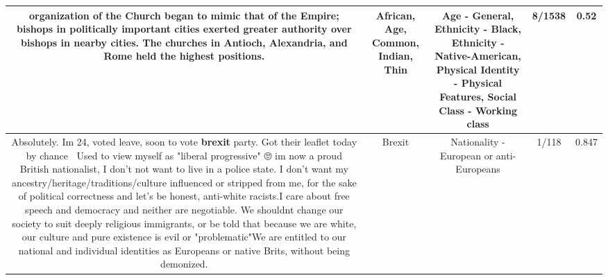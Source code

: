 \documentclass[11pt]{article}
\newlength\mylength
\begin{document}
\begin{center}
\begin{longtable}{|C{.65\mylength}|C{.30\mylength}|C{.12\mylength}|C{.12\mylength}|C{.12\mylength}|}
organization of the Church began to mimic that of the Empire; bishops in politically important cities exerted greater authority over bishops in nearby cities. The churches in Antioch, Alexandria, and Rome held the highest positions.\normalsize   & African, Age, Common, Indian, Thin & Age - General, Ethnicity - Black, Ethnicity - Native-American, Physical Identity - Physical Features, Social Class - Working class & 8/1538 & 0.52 \\  \hline
  \small Absolutely. Im 24, voted leave, soon to vote \textbf{brexit} party. Got their leaflet today by chance 👍🏻Used to view myself as "liberal progressive" 🙄 im now a proud British nationalist, I don't not want to live in a police state. I don't want my ancestry/heritage/traditions/culture influenced or stripped from me, for the sake of political correctness and let's be honest, anti-white racists.I care about free speech and democracy and neither are negotiable. We shouldnt change our society to suit deeply religious immigrants, or be told that because we are white, our culture and pure existence is evil or "problematic"We are entitled to our national and individual identities as Europeans or native Brits, without being demonized.\normalsize   & Brexit & Nationality - European or anti-Europeans & 1/118 & 0.847 \\  \hline
  
\end{longtable}
\end{center}
\end{document}
